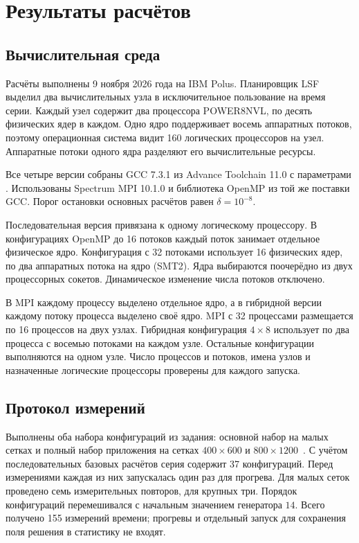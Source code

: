 \section{Результаты расчётов}

\subsection{Вычислительная среда}

Расчёты выполнены 9 ноября 2026 года на IBM Polus.
Планировщик LSF выделил два вычислительных узла в исключительное пользование на время серии.
Каждый узел содержит два процессора POWER8NVL, по десять физических ядер в каждом.
Одно ядро поддерживает восемь аппаратных потоков, поэтому операционная система видит 160 логических процессоров на узел.
Аппаратные потоки одного ядра разделяют его вычислительные ресурсы.

Все четыре версии собраны GCC 7.3.1 из Advance Toolchain 11.0 с параметрами .
Использованы Spectrum MPI 10.1.0 и библиотека OpenMP  из той же поставки GCC.
Порог остановки основных расчётов равен $\delta=10^{-8}$.

Последовательная версия привязана к одному логическому процессору.
В конфигурациях OpenMP до 16 потоков каждый поток занимает отдельное физическое ядро.
Конфигурация с 32 потоками использует 16 физических ядер, по два аппаратных потока на ядро (SMT2).
Ядра выбираются поочерёдно из двух процессорных сокетов.
Динамическое изменение числа потоков отключено.

В MPI каждому процессу выделено отдельное ядро, а в гибридной версии каждому потоку процесса выделено своё ядро.
MPI с 32 процессами размещается по 16 процессов на двух узлах.
Гибридная конфигурация $4\times8$ использует по два процесса с восемью потоками на каждом узле.
Остальные конфигурации выполняются на одном узле.
Число процессов и потоков, имена узлов и назначенные логические процессоры проверены для каждого запуска.

\subsection{Протокол измерений}

Выполнены оба набора конфигураций из задания: основной набор на малых сетках и полный набор приложения на сетках $400\times600$ и $800\times1200$~\cite{assignment}.
С учётом последовательных базовых расчётов серия содержит 37 конфигураций.
Перед измерениями каждая из них запускалась один раз для прогрева.
Для малых сеток проведено семь измерительных повторов, для крупных три.
Порядок конфигураций перемешивался с начальным значением генератора $14$.
Всего получено 155 измерений времени; прогревы и отдельный запуск для сохранения поля решения в статистику не входят.

